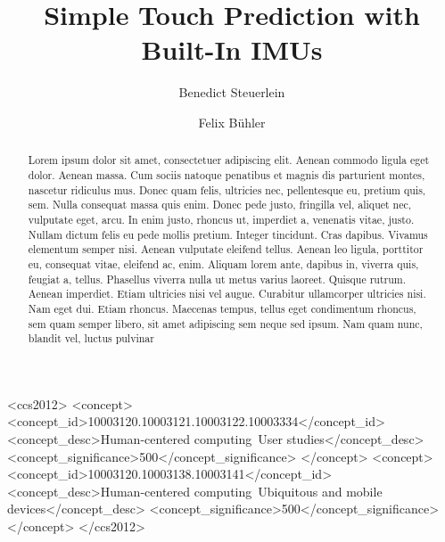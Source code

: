 \documentclass[sigchi-a, authorversion]{acmart}
\begin{document}
\title{Simple Touch Prediction with Built-In IMUs}

\author{Benedict Steuerlein}

\author{Felix Bühler}


\renewcommand{\shortauthors}{F. Author et al.}


%
%


\begin{CCSXML}
<ccs2012>
 <concept>
<concept_id>10003120.10003121.10003122.10003334</concept_id>
<concept_desc>Human-centered computing~User studies</concept_desc>
<concept_significance>500</concept_significance>
</concept>
<concept>
<concept_id>10003120.10003138.10003141</concept_id>
<concept_desc>Human-centered computing~Ubiquitous and mobile devices</concept_desc>
<concept_significance>500</concept_significance>
</concept>
</ccs2012>
\end{CCSXML}



\begin{abstract}
Lorem ipsum dolor sit amet, consectetuer adipiscing elit. Aenean commodo ligula eget dolor. Aenean massa. Cum sociis natoque penatibus et magnis dis parturient montes, nascetur ridiculus mus. Donec quam felis, ultricies nec, pellentesque eu, pretium quis, sem. Nulla consequat massa quis enim. Donec pede justo, fringilla vel, aliquet nec, vulputate eget, arcu. In enim justo, rhoncus ut, imperdiet a, venenatis vitae, justo. Nullam dictum felis eu pede mollis pretium. Integer tincidunt. Cras dapibus. Vivamus elementum semper nisi. Aenean vulputate eleifend tellus. Aenean leo ligula, porttitor eu, consequat vitae, eleifend ac, enim. Aliquam lorem ante, dapibus in, viverra quis, feugiat a, tellus. Phasellus viverra nulla ut metus varius laoreet. Quisque rutrum. Aenean imperdiet. Etiam ultricies nisi vel augue. Curabitur ullamcorper ultricies nisi. Nam eget dui. Etiam rhoncus. Maecenas tempus, tellus eget condimentum rhoncus, sem quam semper libero, sit amet adipiscing sem neque sed ipsum. Nam quam nunc, blandit vel, luctus pulvinar
\end{abstract}
\end{document}
